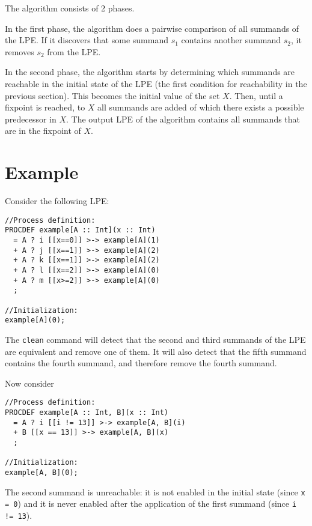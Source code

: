 The algorithm consists of 2 phases.

In the first phase, the algorithm does a pairwise comparison of all summands of the LPE.
If it discovers that some summand $s_1$ contains another summand $s_2$, it removes $s_2$ from the LPE.

In the second phase, the algorithm starts by determining which summands are reachable in the initial state of the LPE (the first condition for reachability in the previous section).
This becomes the initial value of the set $X$.
Then, until a fixpoint is reached, to $X$ all summands are added of which there exists a possible predecessor in $X$.
The output LPE of the algorithm contains all summands that are in the fixpoint of $X$.

\section{Example}

Consider the following LPE:

\begin{lstlisting}
//Process definition:
PROCDEF example[A :: Int](x :: Int)
  = A ? i [[x==0]] >-> example[A](1)
  + A ? j [[x==1]] >-> example[A](2)
  + A ? k [[x==1]] >-> example[A](2)
  + A ? l [[x==2]] >-> example[A](0)
  + A ? m [[x>=2]] >-> example[A](0)
  ;

//Initialization:
example[A](0);
\end{lstlisting}

The \texttt{clean} command will detect that the second and third summands of the LPE are equivalent and remove one of them.
It will also detect that the fifth summand contains the fourth summand, and therefore remove the fourth summand.

Now consider

\begin{lstlisting}
//Process definition:
PROCDEF example[A :: Int, B](x :: Int)
  = A ? i [[i != 13]] >-> example[A, B](i)
  + B [[x == 13]] >-> example[A, B](x)
  ;

//Initialization:
example[A, B](0);
\end{lstlisting}

The second summand is unreachable: it is not enabled in the initial state (since \texttt{x = 0}) and it is never enabled after the application of the first summand (since \texttt{i != 13}).

